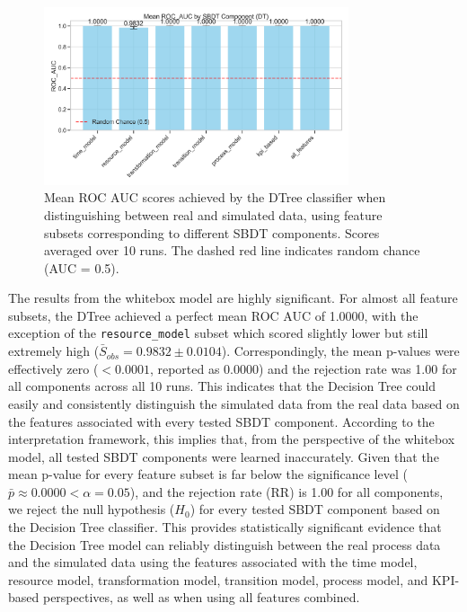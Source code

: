 \begin{figure}[htbp]
  \centering
  \includegraphics[width=0.8\textwidth]{figures/dt-roc-auc-by-component.png}
  \caption{Mean ROC AUC scores achieved by the DTree classifier when distinguishing between real and simulated data, using feature subsets corresponding to different SBDT components. Scores averaged over 10 runs. The dashed red line indicates random chance (AUC = 0.5).}
  \label{fig:dt-roc-auc}
\end{figure}

The results from the whitebox model are highly significant. For almost all feature subsets, the DTree achieved a perfect mean ROC AUC of 1.0000, with the exception of the \texttt{resource\_model} subset which scored slightly lower but still extremely high ($\bar{S}_{obs}=0.9832 \pm 0.0104$). Correspondingly, the mean p-values were effectively zero ($< 0.0001$, reported as 0.0000) and the rejection rate was 1.00 for all components across all 10 runs. This indicates that the Decision Tree could easily and consistently distinguish the simulated data from the real data based on the features associated with every tested SBDT component. According to the interpretation framework, this implies that, from the perspective of the whitebox model, all tested SBDT components were learned inaccurately.
Given that the mean p-value for every feature subset is far below the significance level ($\bar{p} \approx 0.0000 < \alpha = 0.05$), and the rejection rate (RR) is 1.00 for all components, we reject the null hypothesis ($H_0$) for every tested SBDT component based on the Decision Tree classifier. This provides statistically significant evidence that the Decision Tree model can reliably distinguish between the real process data and the simulated data using the features associated with the time model, resource model, transformation model, transition model, process model, and KPI-based perspectives, as well as when using all features combined.

